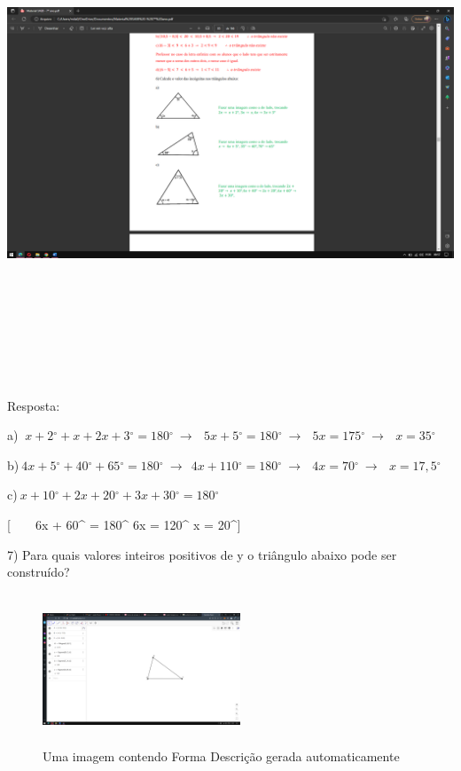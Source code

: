 \includegraphics[width=6.69746in,height=5.82326in]{./imgSAEB_7_MAT/media/image47.png}

Resposta:

a)
\(\ x + 2{^\circ} + x + 2x + 3{^\circ} = 180{^\circ}\  \rightarrow \ \ \ 5x + 5{^\circ} = 180{^\circ}\  \rightarrow \ \ \ 5x = 175{^\circ}\  \rightarrow \ \ \ x = 35{^\circ}\)

b)\(\ 4x + 5{^\circ} + 40{^\circ} + 65{^\circ} = 180{^\circ}\  \rightarrow \ \ 4x + 110{^\circ} = 180{^\circ}\  \rightarrow \ \ \ 4x = 70{^\circ}\  \rightarrow \ \ \ x = 17,5{^\circ}\)

c)\(\ x + 10{^\circ} + 2x + 20{^\circ} + 3x + 30{^\circ} = 180{^\circ}\)

[\ \ \ \ 6x + 60{^\circ} = 180{^\circ} \rightarrow 6x = 120{^\circ} \rightarrow x = 20{^\circ}]

7) Para quais valores inteiros positivos de y o triângulo abaixo pode
ser construído?

\begin{figure}
\centering
\includegraphics[width=2.326in,height=1.77118in]{./imgSAEB_7_MAT/media/image48.png}
\caption{Uma imagem contendo Forma Descrição gerada automaticamente}
\end{figure}

